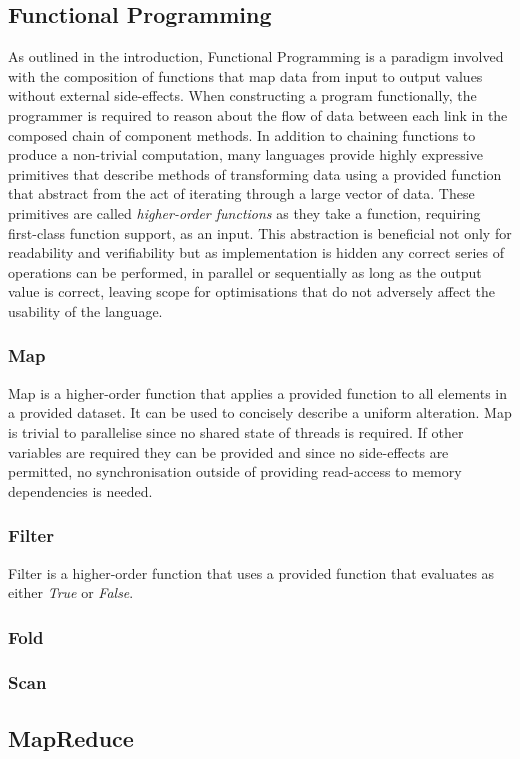 \subsection{Functional Programming}
As outlined in the introduction, Functional Programming is a paradigm involved with the composition of functions that map data from input to output values without external side-effects. When constructing a program functionally, the programmer is required to reason about the flow of data between each link in the composed chain of component methods. In addition to chaining functions to produce a non-trivial computation, many languages provide highly expressive primitives that describe methods of transforming data using a provided function that abstract from the act of iterating through a large vector of data. These primitives are called \emph{higher-order functions} as they take a function, requiring first-class function support, as an input. This abstraction is beneficial not only for readability and verifiability but as implementation is hidden any correct series of operations can be performed, in parallel or sequentially as long as the output value is correct, leaving scope for optimisations that do not adversely affect the usability of the language.
\subsubsection{Map}
Map is a higher-order function that applies a provided function to all elements in a provided dataset. It can be used to concisely describe a uniform alteration. Map is trivial to parallelise since no shared state of threads is required. If other variables are required they can be provided and since no side-effects are permitted, no synchronisation outside of providing read-access to memory dependencies is needed.
\subsubsection{Filter}
Filter is a higher-order function that uses a provided function that evaluates as either \emph{True} or \emph{False}.
\subsubsection{Fold}
\subsubsection{Scan}
\subsection{MapReduce}
